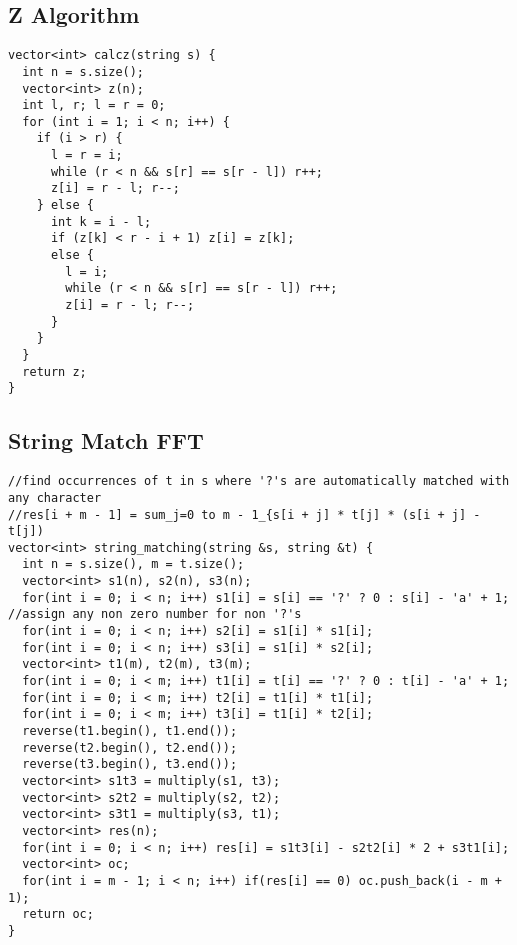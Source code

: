 \documentclass[10pt,a4paper,onesided]{article}
\begin{document}
\begin{multicols*}{3}
\subsection{Z Algorithm}
\begin{lstlisting}
vector<int> calcz(string s) {
  int n = s.size();
  vector<int> z(n);
  int l, r; l = r = 0;
  for (int i = 1; i < n; i++) {
    if (i > r) {
      l = r = i;
      while (r < n && s[r] == s[r - l]) r++;
      z[i] = r - l; r--;
    } else {
      int k = i - l;
      if (z[k] < r - i + 1) z[i] = z[k];
      else {
        l = i;
        while (r < n && s[r] == s[r - l]) r++;
        z[i] = r - l; r--;
      }
    }
  }
  return z;
}
\end{lstlisting}
\subsection{String Match FFT}
\begin{lstlisting}
//find occurrences of t in s where '?'s are automatically matched with any character
//res[i + m - 1] = sum_j=0 to m - 1_{s[i + j] * t[j] * (s[i + j] - t[j])
vector<int> string_matching(string &s, string &t) {
  int n = s.size(), m = t.size();
  vector<int> s1(n), s2(n), s3(n);
  for(int i = 0; i < n; i++) s1[i] = s[i] == '?' ? 0 : s[i] - 'a' + 1; //assign any non zero number for non '?'s
  for(int i = 0; i < n; i++) s2[i] = s1[i] * s1[i];
  for(int i = 0; i < n; i++) s3[i] = s1[i] * s2[i];
  vector<int> t1(m), t2(m), t3(m);
  for(int i = 0; i < m; i++) t1[i] = t[i] == '?' ? 0 : t[i] - 'a' + 1;
  for(int i = 0; i < m; i++) t2[i] = t1[i] * t1[i];
  for(int i = 0; i < m; i++) t3[i] = t1[i] * t2[i];
  reverse(t1.begin(), t1.end());
  reverse(t2.begin(), t2.end());
  reverse(t3.begin(), t3.end());
  vector<int> s1t3 = multiply(s1, t3);
  vector<int> s2t2 = multiply(s2, t2);
  vector<int> s3t1 = multiply(s3, t1);
  vector<int> res(n);
  for(int i = 0; i < n; i++) res[i] = s1t3[i] - s2t2[i] * 2 + s3t1[i];
  vector<int> oc;
  for(int i = m - 1; i < n; i++) if(res[i] == 0) oc.push_back(i - m + 1);
  return oc;
}
\end{lstlisting}

\end{multicols*}
\end{document}
